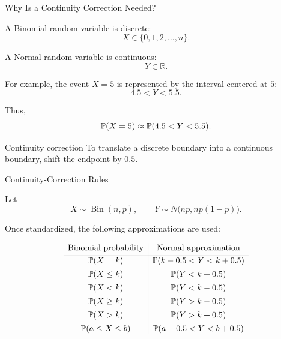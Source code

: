 \begin{frame}{Why Is a Continuity Correction Needed?}

A Binomial random variable is discrete:
\[
X\in\{0,1,2,\ldots,n\}.
\]

A Normal random variable is continuous:
\[
Y\in\mathbb{R}.
\]

For example, the event \(X=5\) is represented by the interval centered at
\(5\):
\[
4.5<Y<5.5.
\]

Thus,
\[
\mathbb{P}(X=5)
\approx
\mathbb{P}(4.5<Y<5.5).
\]

\vspace{0.25cm}

\begin{keybox}{Continuity correction}
To translate a discrete boundary into a continuous boundary, shift the
endpoint by \(0.5\).
\end{keybox}

\end{frame}


\begin{frame}{Continuity-Correction Rules}

Let
\[
X\sim\operatorname{Bin}(n,p),
\qquad
Y\sim N\bigl(np,np(1-p)\bigr).
\]

Once standardized, the following approximations are used:

\[
\begin{array}{c|c}
\text{Binomial probability}
&
\text{Normal approximation}
\\[0.1cm]
\hline
\mathbb{P}(X=k)
&
\mathbb{P}(k-0.5<Y<k+0.5)
\\[0.15cm]
\mathbb{P}(X\leq k)
&
\mathbb{P}(Y<k+0.5)
\\[0.15cm]
\mathbb{P}(X<k)
&
\mathbb{P}(Y<k-0.5)
\\[0.15cm]
\mathbb{P}(X\geq k)
&
\mathbb{P}(Y>k-0.5)
\\[0.15cm]
\mathbb{P}(X>k)
&
\mathbb{P}(Y>k+0.5)
\\[0.15cm]
\mathbb{P}(a\leq X\leq b)
&
\mathbb{P}(a-0.5<Y<b+0.5)
\end{array}
\]

\end{frame}



